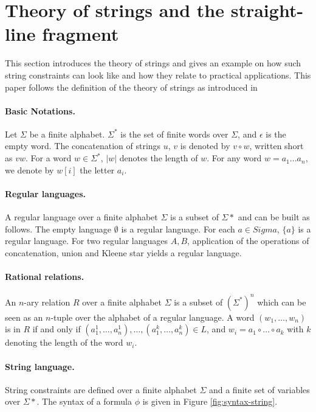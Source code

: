 
\section{Theory of strings and the straight-line fragment}
\label{sec:preliminaries}

This section introduces the theory of strings and gives an example on how such string constraints can look like and how they relate to practical applications.
This paper follows the definition of the theory of strings as introduced in ~\cite{??}


\paragraph*{\bfseries Basic Notations.}
Let $\Sigma$ be a finite alphabet. $\Sigma^*$ is the set of finite words over $\Sigma$, and $\epsilon$ is the empty word. The concatenation of strings $u$, $v$ is denoted by $ v \circ  w$, written short as $vw$. For a word $w \in \Sigma^*$, $| w |$ denotes the length of $w$. 
For any word $w = a_1 ... a_n$, we denote by $w[i]$ the letter $a_i$.

\paragraph{Regular languages.}A regular language over a finite alphabet $\Sigma$ is a subset of $\Sigma*$ and can be built as follows. 
The empty language $\emptyset$ is a regular language.
For each $a \in Sigma$, $\{a\}$ is a regular language.
For two regular languages $A,B$, application of the operations of concatenation, union and Kleene star yields a regular language.
\paragraph{Rational relations.} An $n$-ary relation $R$ over a finite alphabet $\Sigma$ is a subset of $(\Sigma^*)^n$ which can be seen as an $n$-tuple over the alphabet of a regular language. A word $(w_1,\dots,w_n)$ is in $R$ if and only if $(a_1^1,\dots,a_n^1),\dots, (a_1^k,\dots,a_n^k) \in L$, and $w_i = a_1 \circ \dots \circ a_k$ with $k$ denoting the length of the word $w_i$.

\paragraph{String language.} String constraints are defined over a finite alphabet $\Sigma$ and a finite set of variables over $\Sigma*$.
The syntax of a formula $\phi$ is given in Figure \ref{fig:syntax-string}.

